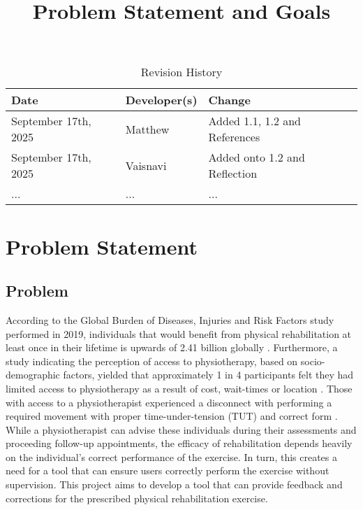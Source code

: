 \documentclass{article}
\title{Problem Statement and Goals\\\progname}
\author{\authname}
\date{}
\begin{document}
\maketitle

\begin{table}[hp]
\caption{Revision History} \label{TblRevisionHistory}
\begin{tabularx}{\textwidth}{llX}
\toprule
\textbf{Date} & \textbf{Developer(s)} & \textbf{Change}\\
\midrule
September 17th, 2025 & Matthew & Added 1.1, 1.2 and References\\
September 17th, 2025 & Vaisnavi & Added onto 1.2 and Reflection\\
... & ... & ...\\
\bottomrule
\end{tabularx}
\end{table}

\section{Problem Statement}

\subsection{Problem}

According to the Global Burden of Diseases, Injuries and Risk Factors study performed in 2019, 
individuals that would benefit from physical rehabilitation at least once in their 
lifetime is upwards of 2.41 billion globally \citep{CiezaEtAl2021}.
Furthermore, a study indicating the perception of access to physiotherapy, based on 
socio-demographic factors, yielded that approximately 1 in 4 participants 
felt they had limited access to physiotherapy as a result of cost, wait-times or 
location \citep{BathEtAl2016}. Those with access to a physiotherapist experienced a 
disconnect with performing a required movement with proper time-under-tension (TUT) and 
correct form \citep{FaberEtAl2015}. While a physiotherapist can advise these individuals
during their assessments and proceeding follow-up appointments, the efficacy of rehabilitation
depends heavily on the individual's correct performance of the exercise. In turn, this creates a need for a tool that can ensure users 
correctly perform the exercise without supervision. This project aims to develop a tool that can 
provide feedback and corrections for the prescribed physical rehabilitation exercise.
\end{document}
